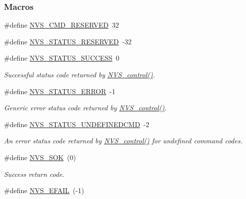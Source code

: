 \subsubsection*{Macros}
\begin{DoxyCompactItemize}
\item 
\#define \hyperlink{group___n_v_s___c_o_n_t_r_o_l_gaa9fa1c41660d17139bce63ff34cd774f}{N\+V\+S\+\_\+\+C\+M\+D\+\_\+\+R\+E\+S\+E\+R\+V\+E\+D}~32
\item 
\#define \hyperlink{group___n_v_s___c_o_n_t_r_o_l_gad82fd139152ca14946c80c6c91edb4a0}{N\+V\+S\+\_\+\+S\+T\+A\+T\+U\+S\+\_\+\+R\+E\+S\+E\+R\+V\+E\+D}~-\/32
\item 
\#define \hyperlink{group___n_v_s___s_t_a_t_u_s_ga5f3b6583ee909863b86799762dc8b4aa}{N\+V\+S\+\_\+\+S\+T\+A\+T\+U\+S\+\_\+\+S\+U\+C\+C\+E\+S\+S}~0
\begin{DoxyCompactList}\small\item\em Successful status code returned by \hyperlink{_n_v_s_8h_adb26bd05e4f063191411ac5ad968b1d9}{N\+V\+S\+\_\+control()}. \end{DoxyCompactList}\item 
\#define \hyperlink{group___n_v_s___s_t_a_t_u_s_ga995c9896630b7a0cd1662e7be9c4cf34}{N\+V\+S\+\_\+\+S\+T\+A\+T\+U\+S\+\_\+\+E\+R\+R\+O\+R}~-\/1
\begin{DoxyCompactList}\small\item\em Generic error status code returned by \hyperlink{_n_v_s_8h_adb26bd05e4f063191411ac5ad968b1d9}{N\+V\+S\+\_\+control()}. \end{DoxyCompactList}\item 
\#define \hyperlink{group___n_v_s___s_t_a_t_u_s_gac8aa59663f65af4fa564a3a83cd7d6e1}{N\+V\+S\+\_\+\+S\+T\+A\+T\+U\+S\+\_\+\+U\+N\+D\+E\+F\+I\+N\+E\+D\+C\+M\+D}~-\/2
\begin{DoxyCompactList}\small\item\em An error status code returned by \hyperlink{_n_v_s_8h_adb26bd05e4f063191411ac5ad968b1d9}{N\+V\+S\+\_\+control()} for undefined command codes. \end{DoxyCompactList}\item 
\#define \hyperlink{_n_v_s_8h_a6ea76de6ce4b7acecab17c0a1d900d90}{N\+V\+S\+\_\+\+S\+O\+K}~(0)
\begin{DoxyCompactList}\small\item\em Success return code. \end{DoxyCompactList}\item 
\#define \hyperlink{_n_v_s_8h_a99d797951d6c3adbaf6e19b415dc5673}{N\+V\+S\+\_\+\+E\+F\+A\+I\+L}~(-\/1)

\end{DoxyCompactItemize}
